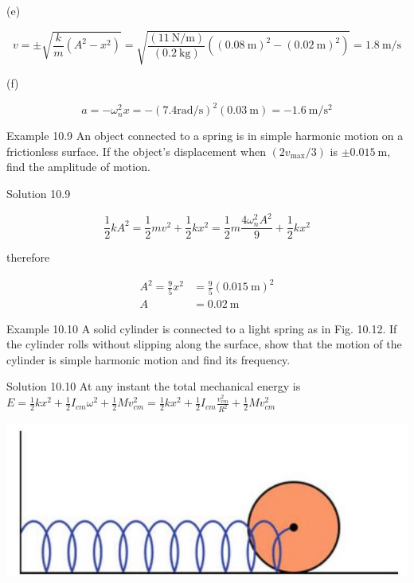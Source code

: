 \documentclass[10pt]{article}
\begin{document}
(e)

$$
v= \pm \sqrt{\frac{k}{m}\left(A^{2}-x^{2}\right)}=\sqrt{\frac{(11 \mathrm{~N} / \mathrm{m})}{(0.2 \mathrm{~kg})}\left((0.08 \mathrm{~m})^{2}-(0.02 \mathrm{~m})^{2}\right)}=1.8 \mathrm{~m} / \mathrm{s}
$$

(f)

$$
a=-\omega_{n}^{2} x=-(7.4 \mathrm{rad} / \mathrm{s})^{2}(0.03 \mathrm{~m})=-1.6 \mathrm{~m} / \mathrm{s}^{2}
$$

Example 10.9 An object connected to a spring is in simple harmonic motion on a frictionless surface. If the object's displacement when $\left(2 v_{\max } / 3\right)$ is $\pm 0.015 \mathrm{~m}$, find the amplitude of motion.

Solution 10.9

$$
\frac{1}{2} k A^{2}=\frac{1}{2} m v^{2}+\frac{1}{2} k x^{2}=\frac{1}{2} m \frac{4 \omega_{n}^{2} A^{2}}{9}+\frac{1}{2} k x^{2}
$$

therefore

$$
\begin{aligned}
A^{2}=\frac{9}{5} x^{2} & =\frac{9}{5}(0.015 \mathrm{~m})^{2} \\
A & =0.02 \mathrm{~m}
\end{aligned}
$$

Example 10.10 A solid cylinder is connected to a light spring as in Fig. 10.12. If the cylinder rolls without slipping along the surface, show that the motion of the cylinder is simple harmonic motion and find its frequency.

Solution 10.10 At any instant the total mechanical energy is\\
$E=\frac{1}{2} k x^{2}+\frac{1}{2} I_{c m} \omega^{2}+\frac{1}{2} M v_{c m}^{2}=\frac{1}{2} k x^{2}+\frac{1}{2} I_{c m} \frac{v_{c m}^{2}}{R^{2}}+\frac{1}{2} M v_{c m}^{2}$

\begin{center}
\includegraphics[max width=\textwidth]{2024_09_13_db1f357d2aad0a03eb2eg-169}
\end{center}
\end{document}
